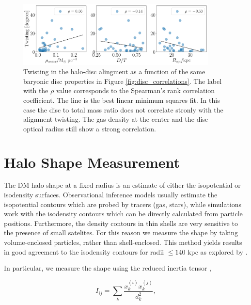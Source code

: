 \documentclass[usenatbib]{mnras}
\begin{document}
\begin{figure}
\begin{center}
\includegraphics[width=0.9\textwidth]{correlations_angles_alignment_MHD.pdf}
\end{center}
\caption{Twisting in the halo-disc alingment as a function of the same
  baryonic disc properties in Figure \ref{fig:disc_correlations}.
  The label with the $\rho$ value corresponds to the Spearman's rank
  correlation coefficient.
  The line is the best linear minimum squares fit.
  In this case the disc to total mass ratio does not correlate stronly
  with the alignment twisting.
  The gas density at the center and the disc optical radius still show
  a strong correlation.}
\label{fig:alignment_correlations}
\end{figure}




\section{Halo Shape Measurement}
\label{sec:method}

The DM halo shape at a fixed radius is an estimate of either
the isopotential or isodensity surfaces.  
Observational inference models usually estimate the 
isopotential contours which are probed by tracers (gas, stars), while
simulations work with the isodensity contours which can be directly
calculated from particle positions.  
Furthermore, the density contours in thin shells are very sensitive to
the presence of small satelites.  
For this reason we measure the shape by taking
volume-enclosed particles, rather than shell-enclosed.  
This method yields results in good agreement to the isodensity
contours for radii $\leq 140$ kpc as explored by
\citep{VeraCiro11}.  


In particular, we measure the shape using the reduced inertia tensor
\citep{Allgood06},  

\begin{equation}
I_{ij} = \sum_k \frac{x_k^{(i)}x_k^{(j)}}{d^2_k},
\label{eq:inertia}
\end{equation}
\end{document}
